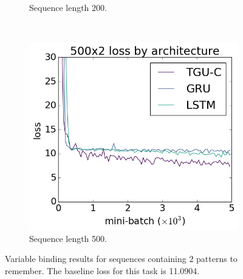 \begin{figure}[htb]
\begin{subfigure}[t]{0.3\linewidth}
	\caption{Sequence length 200.}
\end{subfigure}~
\begin{subfigure}[t]{0.3\linewidth}
	\includegraphics[width=\linewidth]{exps/vbind/plots/500x2}
	\caption{Sequence length 500.}
\end{subfigure}

\caption[Variable binding results, two patterns]
{Variable binding results for sequences containing \(2\) patterns to remember. The baseline loss for this
task is 11.0904.}
\label{fig:vbindn2}
\end{figure}

